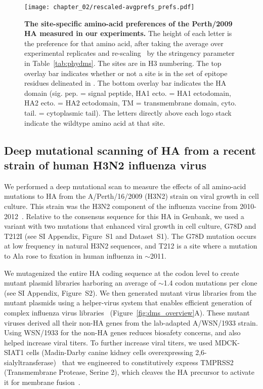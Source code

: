 \begin{figure}
\centering
\texttt{[image: chapter\_02/rescaled-avgprefs\_prefs.pdf]}
\caption{\label{fig:logoplot}
{\bf The site-specific amino-acid preferences of the Perth/2009 HA measured in our experiments.}
The height of each letter is the preference for that amino acid, after taking the average over experimental replicates and re-scaling~\citep{hilton2017phydms} by the stringency parameter in Table~\ref{tab:phydms}.
The sites are in H3 numbering.
The top overlay bar indicates whether or not a site is in the set of epitope residues delineated in \citet{Wolf:2006da}.
The bottom overlay bar indicates the HA domain (sig. pep. = signal peptide, HA1 ecto. = HA1 ectodomain, HA2 ecto. = HA2 ectodomain, TM = transmembrane domain, cyto. tail. = cytoplasmic tail).
The letters directly above each logo stack indicate the wildtype amino acid at that site.
}
\end{figure}

\subsection{Deep mutational scanning of HA from a recent strain of human H3N2 influenza virus}
We performed a deep mutational scan to measure the effects of all amino-acid mutations to HA from the A/Perth/16/2009 (H3N2) strain on viral growth in cell culture.
This strain was the H3N2 component of the influenza vaccine from 2010-2012~\citep{who2010d,who2011}.
Relative to the consensus sequence for this HA in Genbank, we used a variant with two mutations that enhanced viral growth in cell culture, G78D and T212I (see \citet{Lee2018} SI Appendix, Figure~S1 and Dataset~S1).
The G78D mutation occurs at low frequency in natural H3N2 sequences, and T212 is a site where a mutation to Ala rose to fixation in human influenza in $\sim$2011.

We mutagenized the entire HA coding sequence at the codon level to create mutant plasmid libraries harboring an average of $\sim$1.4 codon mutations per clone (see \citet{Lee2018} SI Appendix, Figure~S2).
We then generated mutant virus libraries from the mutant plasmids using a helper-virus system that enables efficient generation of complex influenza virus libraries~\citep{Doud:2016gm} (Figure~\ref{fig:dms_overview}A).
These mutant viruses derived all their non-HA genes from the lab-adapted A/WSN/1933 strain.
Using WSN/1933 for the non-HA genes reduces biosafety concerns, and also helped increase viral titers.
To further increase viral titers, we used MDCK-SIAT1 cells (Madin-Darby canine kidney cells overexpressing 2,6-sialyltransferase)~\citep{matrosovich2003overexpression} that we engineered to constitutively express TMPRSS2 (Transmembrane Protease, Serine 2), which cleaves the HA precursor to activate it for membrane fusion~\citep{bottcher2006proteolytic, bottcher2010cleavage}.

